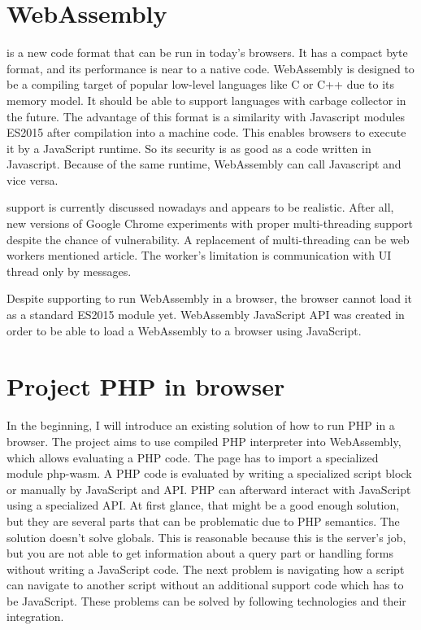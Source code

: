 \section{WebAssembly}

\cite{WebAssembly} is a new code format that can be run in today's browsers. 
It has a compact byte format, and its performance is near to a native code. 
WebAssembly is designed to be a compiling target of popular low-level languages like C or C++ due to its memory model. 
It should be able to support languages with carbage collector in the future. 
The advantage of this format is a similarity with Javascript modules ES2015 after compilation into a machine code. 
This enables browsers to execute it by a JavaScript runtime. 
So its security is as good as a code written in Javascript. 
Because of the same runtime, WebAssembly can call Javascript and vice versa.

\cite{Threads} support is currently discussed nowadays and appears to be realistic.
After all, new versions of Google Chrome experiments with proper multi-threading support despite the chance of vulnerability.
A replacement of multi-threading can be web workers mentioned \cite{WebWorkers} article.
The worker's limitation is communication with UI thread only by messages.

Despite supporting to run WebAssembly in a browser, the browser cannot load it as a standard ES2015 module yet.
WebAssembly JavaScript API was created in order to be able to load a WebAssembly to a browser using JavaScript.

\section{Project PHP in browser}

In the beginning, I will introduce an existing solution of how to run PHP in a browser. 
The project \cite{Pib} aims to use compiled PHP interpreter into WebAssembly, which allows evaluating a PHP code.
The page has to import a specialized module php-wasm. 
A PHP code is evaluated by writing a specialized script block or manually by JavaScript and API.
PHP can afterward interact with JavaScript using a specialized API.
At first glance, that might be a good enough solution, but they are several parts that can be problematic due to PHP semantics.
The solution doesn't solve globals. 
This is reasonable because this is the server's job, but you are not able to get information about a query part or handling forms without writing a JavaScript code.
The next problem is navigating how a script can navigate to another script without an additional support code which has to be JavaScript.
These problems can be solved by following technologies and their integration.

